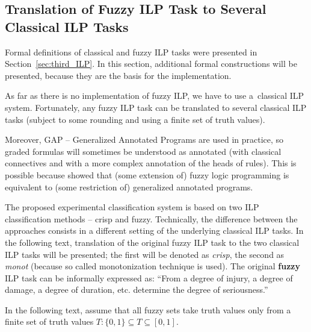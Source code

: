 \subsection{Translation of Fuzzy ILP Task to Several Classical ILP Tasks} \label{sec:fuzzy_ilp_task_translation}

Formal definitions of classical and fuzzy ILP tasks were presented in Section~\ref{sec:third_ILP}. In this section, additional formal constructions will be presented, because they are the basis for the implementation.


As far as there is no implementation of fuzzy ILP, we have to use a~classical ILP system. Fortunately, any fuzzy ILP task can be translated to several classical ILP tasks (subject to some rounding and using a finite set of truth values).

Moreover, GAP -- Generalized Annotated Programs \citep{Kifer:1992:TGA:139720.139723} are used in practice, so graded formulas will sometimes be understood as annotated (with classical connectives and with a more complex annotation of the heads of rules). This is possible because \cite{biblio:KLV} showed that (some extension of) fuzzy logic programming is equivalent to (some restriction of) generalized annotated programs. 

The proposed experimental classification system is based on two ILP classification methods -- crisp and fuzzy. 
Technically, the difference between the approaches consists in a different setting of the underlying classical ILP tasks. 
In the following text, translation of the original fuzzy ILP task to the two classical ILP tasks will be presented; the first will be denoted as \emph{crisp}, the second as \emph{monot} (because so called monotonization technique is used). The original \textbf{fuzzy} ILP task can be informally expressed as: ``From a degree of injury, a degree of damage, a degree of duration, etc. determine the degree of seriousness.''   

\bigskip
In the following text, assume that all fuzzy sets take truth values only from a finite set of truth values $T: \{0,1\}\subseteq T\subseteq [0,1]$.

